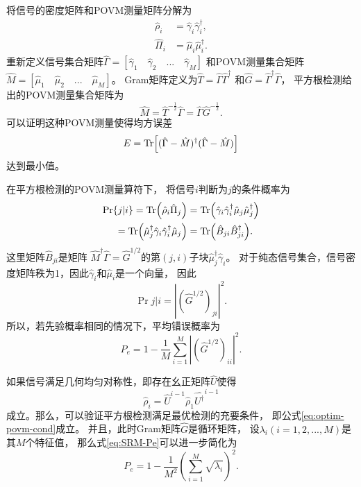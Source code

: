 将信号的密度矩阵和POVM测量矩阵分解为
\begin{equation}
\begin{split}
\hat{\rho}_i & = \hat{\gamma}_i \hat{\gamma}_i^\dagger,\\
\hat{\Pi}_i & = \hat{\mu}_i \hat{\mu}_i^\dagger.
\end{split}
\end{equation}
重新定义信号集合矩阵$\hat{\Gamma}=[\hat{\gamma}_1 \quad \hat{\gamma}_2 \quad ...\quad \hat{\gamma}_M]$
和POVM测量集合矩阵$\hat{M} = [\hat{\mu}_1\quad \hat{\mu}_2\quad ...\quad \hat{\mu}_M]$。
Gram矩阵定义为$\hat{T} = \hat{\Gamma} \hat{\Gamma}^\dagger$
和$\hat{G} = \hat{\Gamma}^\dagger \hat{\Gamma}$，
平方根检测给出的POVM测量集合矩阵为
\begin{equation}
\hat{M} = \hat{T}^{-\frac{1}{2}} \hat{\Gamma} = \hat{\Gamma} \hat{G}^{-\frac{1}{2}}.
\end{equation}
可以证明这种POVM测量使得均方误差
\begin{equation}
E = \Tr[(\hat{\Gamma} - \hat{M})^\dagger (\hat{\Gamma} - \hat{M})]
\end{equation}
达到最小值\cite{eldar2001quantum}。

在平方根检测的POVM测量算符下，
将信号$i$判断为$j$的条件概率为
\begin{equation}
\begin{split}
\Pr{j|i} = \Tr(\hat{\rho}_i \hat{\Pi}_j) & = \Tr(\hat{\gamma}_i \hat{\gamma}_i^\dagger \hat{\mu}_j \hat{\mu}_j^\dagger) \\
     =\Tr(\hat{\mu}_j^\dagger\hat{\gamma}_i \hat{\gamma}_i^\dagger \hat{\mu}_j )     & = \Tr(\hat{B}_{ji} \hat{B}_{ji}^\dagger).
\end{split}
\end{equation}
这里矩阵$\hat{B}_{ji}$是矩阵 $\hat{M}^\dagger \hat{\Gamma} = \hat{G}^{1/2}$的第$(j,i)$子块$\hat{\mu}_j^\dagger\hat{\gamma}_i$。
对于纯态信号集合，信号密度矩阵秩为1，因此$\hat{\gamma}_i$和$\hat{\mu}_i$是一个向量，
因此
\begin{equation}
\Pr{j|i} = |(\hat{G}^{1/2})_{ji}|^2.
\end{equation}
所以，若先验概率相同的情况下，平均错误概率为
\begin{equation}
P_e = 1 - \frac{1}{M}\sum_{i=1}^M |(\hat{G}^{1/2})_{ii}|^2.
\label{eq:SRM-Pe}
\end{equation}


如果信号满足几何均匀对称性，即存在幺正矩阵$\hat{U}$使得
\begin{equation}
\hat{\rho}_i = \hat{U}^{i-1} \hat{\rho}_1 \hat{U^\dagger} ^ {i-1}
\end{equation}
成立。那么，可以验证平方根检测满足最优检测的充要条件\cite{eldar2001quantum}，
即公式\ref{eq:optim-povm-cond}成立。
并且，此时Gram矩阵$\hat{G}$是循环矩阵，
设$\lambda_i(i=1,2,...,M)$是其$M$个特征值，
那么式\ref{eq:SRM-Pe}可以进一步简化为\cite{kato1999quantum}
\begin{equation}
P_e = 1 - \frac{1}{M^2} (\sum_{i=1}^M \sqrt{\lambda_i})^2.
\label{eq:SRM-Pe-GUS}
\end{equation}

